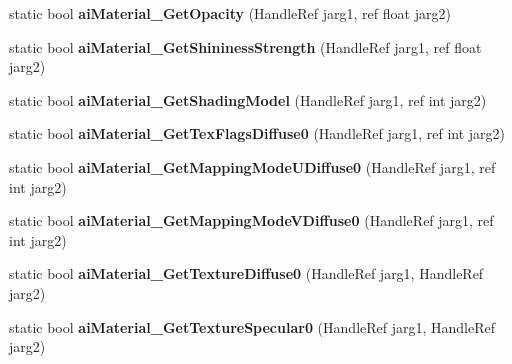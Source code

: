 \begin{DoxyCompactItemize}
\item 
\hypertarget{class_assimp_p_i_n_v_o_k_e_a08b01d4a06ac0fe101c08ddd7902ea7f}{static bool {\bfseries ai\+Material\+\_\+\+Get\+Opacity} (Handle\+Ref jarg1, ref float jarg2)}\label{class_assimp_p_i_n_v_o_k_e_a08b01d4a06ac0fe101c08ddd7902ea7f}

\item 
\hypertarget{class_assimp_p_i_n_v_o_k_e_aafc31f6a1f47ccea7673ff87ae2e7141}{static bool {\bfseries ai\+Material\+\_\+\+Get\+Shininess\+Strength} (Handle\+Ref jarg1, ref float jarg2)}\label{class_assimp_p_i_n_v_o_k_e_aafc31f6a1f47ccea7673ff87ae2e7141}

\item 
\hypertarget{class_assimp_p_i_n_v_o_k_e_a4900499ce4309118a588e0c4dcbec4ee}{static bool {\bfseries ai\+Material\+\_\+\+Get\+Shading\+Model} (Handle\+Ref jarg1, ref int jarg2)}\label{class_assimp_p_i_n_v_o_k_e_a4900499ce4309118a588e0c4dcbec4ee}

\item 
\hypertarget{class_assimp_p_i_n_v_o_k_e_af5bc2282db2f8f5ce3bcc45f557e05b5}{static bool {\bfseries ai\+Material\+\_\+\+Get\+Tex\+Flags\+Diffuse0} (Handle\+Ref jarg1, ref int jarg2)}\label{class_assimp_p_i_n_v_o_k_e_af5bc2282db2f8f5ce3bcc45f557e05b5}

\item 
\hypertarget{class_assimp_p_i_n_v_o_k_e_a50024f206f490bf14b0ddd4b5949a8dd}{static bool {\bfseries ai\+Material\+\_\+\+Get\+Mapping\+Mode\+U\+Diffuse0} (Handle\+Ref jarg1, ref int jarg2)}\label{class_assimp_p_i_n_v_o_k_e_a50024f206f490bf14b0ddd4b5949a8dd}

\item 
\hypertarget{class_assimp_p_i_n_v_o_k_e_a59ccfc5f47f8ecef0dda1311b6f5412b}{static bool {\bfseries ai\+Material\+\_\+\+Get\+Mapping\+Mode\+V\+Diffuse0} (Handle\+Ref jarg1, ref int jarg2)}\label{class_assimp_p_i_n_v_o_k_e_a59ccfc5f47f8ecef0dda1311b6f5412b}

\item 
\hypertarget{class_assimp_p_i_n_v_o_k_e_abeaf241ce35ce575b78b237f39311406}{static bool {\bfseries ai\+Material\+\_\+\+Get\+Texture\+Diffuse0} (Handle\+Ref jarg1, Handle\+Ref jarg2)}\label{class_assimp_p_i_n_v_o_k_e_abeaf241ce35ce575b78b237f39311406}

\item 
\hypertarget{class_assimp_p_i_n_v_o_k_e_ac22bf35d03bae0eb2efd203f069dcd51}{static bool {\bfseries ai\+Material\+\_\+\+Get\+Texture\+Specular0} (Handle\+Ref jarg1, Handle\+Ref jarg2)}\label{class_assimp_p_i_n_v_o_k_e_ac22bf35d03bae0eb2efd203f069dcd51}


\end{DoxyCompactItemize}
